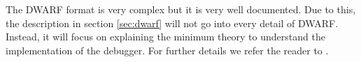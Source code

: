 The \gls{DWARF} format is very complex but it is very well documented.
Due to this, the description in section \ref{sec:dwarf} will not go into every detail of \gls{DWARF}.
Instead, it will focus on explaining the minimum theory to understand the implementation of the debugger.
For further details we refer the reader to \cite{dwarf}.








